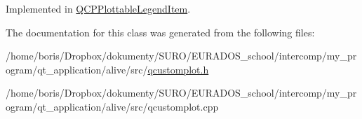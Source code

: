 Implemented in \hyperlink{classQCPPlottableLegendItem_af79ab526cc79f4ea5d9c601d139b2166}{Q\-C\-P\-Plottable\-Legend\-Item}.



The documentation for this class was generated from the following files\-:\begin{DoxyCompactItemize}
\item 
/home/boris/\-Dropbox/dokumenty/\-S\-U\-R\-O/\-E\-U\-R\-A\-D\-O\-S\-\_\-school/intercomp/my\-\_\-program/qt\-\_\-application/alive/src/\hyperlink{qcustomplot_8h}{qcustomplot.\-h}\item 
/home/boris/\-Dropbox/dokumenty/\-S\-U\-R\-O/\-E\-U\-R\-A\-D\-O\-S\-\_\-school/intercomp/my\-\_\-program/qt\-\_\-application/alive/src/qcustomplot.\-cpp\end{DoxyCompactItemize}

